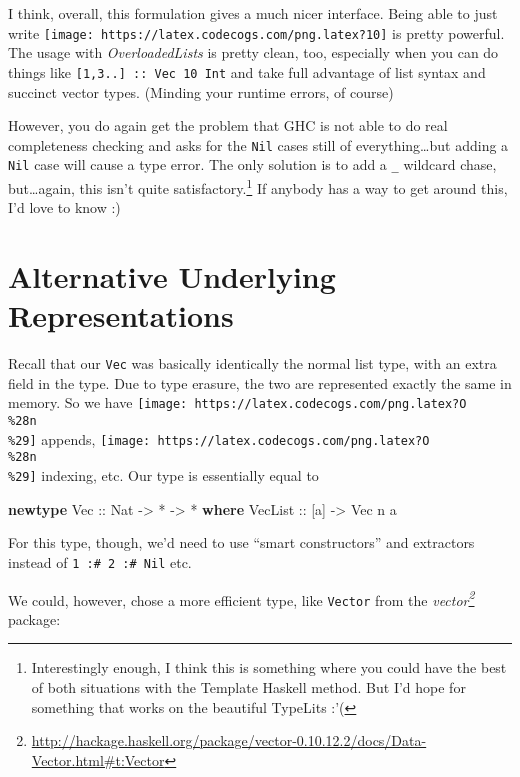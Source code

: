 \documentclass[]{article}
\newenvironment{Shaded}{\begin{snugshade}}{\end{snugshade}}
\newcommand{\DataTypeTok}[1]{\textcolor[rgb]{0.13,0.29,0.53}{#1}}
\newcommand{\FunctionTok}[1]{\textcolor[rgb]{0.00,0.00,0.00}{#1}}
\newcommand{\KeywordTok}[1]{\textcolor[rgb]{0.13,0.29,0.53}{\textbf{#1}}}
\newcommand{\NormalTok}[1]{#1}
\newcommand{\OtherTok}[1]{\textcolor[rgb]{0.56,0.35,0.01}{#1}}
\renewcommand{\href}[2]{#2\footnote{\url{#1}}}
\begin{document}
I think, overall, this formulation gives a much nicer interface. Being able to
just write \texttt{[image: https://latex.codecogs.com/png.latex?10]} is pretty
powerful. The usage with \emph{OverloadedLists} is pretty clean, too, especially
when you can do things like \texttt{{[}1,3..{]}\ ::\ Vec\ 10\ Int} and take full
advantage of list syntax and succinct vector types. (Minding your runtime
errors, of course)

However, you do again get the problem that GHC is not able to do real
completeness checking and asks for the \texttt{Nil} cases still of
everything\ldots{}but adding a \texttt{Nil} case will cause a type error. The
only solution is to add a \texttt{\_} wildcard chase, but\ldots{}again, this
isn't quite satisfactory.\footnote{Interestingly enough, I think this is
  something where you could have the best of both situations with the Template
  Haskell method. But I'd hope for something that works on the beautiful
  TypeLits :'(} If anybody has a way to get around this, I'd love to know :)

\hypertarget{alternative-underlying-representations}{%
\section{Alternative Underlying
Representations}\label{alternative-underlying-representations}}

Recall that our \texttt{Vec} was basically identically the normal list type,
with an extra field in the type. Due to type erasure, the two are represented
exactly the same in memory. So we have
\texttt{[image: https://latex.codecogs.com/png.latex?O\\\%28n\\\%29]} appends,
\texttt{[image: https://latex.codecogs.com/png.latex?O\\\%28n\\\%29]} indexing, etc.
Our type is essentially equal to

\begin{Shaded}
\begin{Highlighting}[]
\KeywordTok{newtype} \DataTypeTok{Vec}\OtherTok{ ::} \DataTypeTok{Nat} \OtherTok{->} \FunctionTok{*} \OtherTok{->} \FunctionTok{*} \KeywordTok{where}
    \DataTypeTok{VecList}\OtherTok{ ::}\NormalTok{ [a] }\OtherTok{->} \DataTypeTok{Vec}\NormalTok{ n a}
\end{Highlighting}
\end{Shaded}

For this type, though, we'd need to use ``smart constructors'' and extractors
instead of \texttt{1\ :\#\ 2\ :\#\ Nil} etc.

We could, however, chose a more efficient type, like \texttt{Vector} from the
\emph{\href{http://hackage.haskell.org/package/vector-0.10.12.2/docs/Data-Vector.html\#t:Vector}{vector}}
package:
\end{document}
